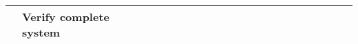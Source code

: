 \begin{table}[ht]
\begin{tabular}{ll|llllllllllllllllllll|}
    \multicolumn{1}{|l|}{\cellcolor[HTML]{38FFF8}\textbf{}}                & \cellcolor[HTML]{38FFF8}\textbf{Verify complete system}                                                              & \multicolumn{1}{l|}{}                                   & \multicolumn{1}{l|}{}                                   & \multicolumn{1}{l|}{}                                   & \multicolumn{1}{l|}{}                                   & \multicolumn{1}{l|}{}                                   & \multicolumn{1}{l|}{}                                   & \multicolumn{1}{l|}{}                                   & \multicolumn{1}{l|}{}                                   & \multicolumn{1}{l|}{}                                   & \multicolumn{1}{l|}{}                                    & \multicolumn{1}{l|}{}                                    & \multicolumn{1}{l|}{}                                    & \multicolumn{1}{l|}{}                                    & \multicolumn{1}{l|}{}                                    & \multicolumn{1}{l|}{}                                    & \multicolumn{1}{l|}{\cellcolor[HTML]{F8A102}}            & \multicolumn{1}{l|}{\cellcolor[HTML]{F8A102}}            & \multicolumn{1}{l|}{\cellcolor[HTML]{F8A102}}            & \multicolumn{1}{l|}{}                                    &             \\ \hline
    \end{tabular}
    \end{table}